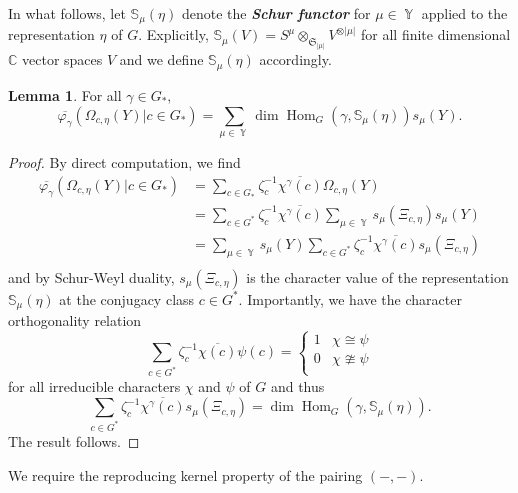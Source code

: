 \documentclass[12pt,reqno]{amsart}
\theoremstyle{definition}
\newtheorem{lem}[thm]{Lemma}
\DeclareMathOperator{\Par}{\mathbb{Y}}
\DeclareMathOperator{\Hom}{\mathrm{Hom}}
\begin{document}
In what follows, let $\mathbb{S}_{\mu}(\eta)$ denote the \textbf{\textit{Schur functor}} for $\mu \in \Par$ applied to the representation $\eta$ of $G.$ Explicitly, 
$\mathbb{S}_{\mu}(V) = S^{\mu} \otimes_{\mathfrak{S}_{|\mu|}} V^{\otimes |\mu|}$ for all finite dimensional $\mathbb{C}$ vector spaces $V$ and we define $\mathbb{S}_{\mu}(\eta)$ accordingly.

\begin{lem}\label{irrep alphabet tranform lem}
For all $\gamma \in G_*,$
    $$\overline{\varphi_{\gamma}}\left( \Omega_{c,\eta}(Y) | c \in G_* \right) =  \sum_{\mu \in \Par} \dim \Hom_{G}(\gamma, \mathbb{S}_{\mu}(\eta)) s_{\mu}(Y).$$
\end{lem}
\begin{proof}
    By direct computation, we find
    \begin{align*}
        \overline{\varphi_{\gamma}}\left( \Omega_{c,\eta}(Y) | c \in G_* \right) &= \sum_{c \in G_*} \zeta_c^{-1} \overline{\chi^{\gamma}(c)} \Omega_{c,\eta}(Y)\\
        &= \sum_{c \in G^*} \zeta_c^{-1} \overline{\chi^{\gamma}(c)} \sum_{\mu \in \Par} s_{\mu}(\Xi_{c,\eta} ) s_{\mu}(Y) \\
        &= \sum_{\mu \in \Par} s_{\mu}(Y) \sum_{c \in G^*} \zeta_c^{-1} \overline{\chi^{\gamma}(c)} s_{\mu}(\Xi_{c,\eta})\\
    \end{align*}
and by Schur-Weyl duality, $s_{\mu}(\Xi_{c,\eta})$ is the character value of the representation $\mathbb{S}_{\mu}(\eta)$ at the conjugacy class $c \in G^*.$ Importantly, we have the character orthogonality relation $$ \sum_{c \in G^*} \zeta_c^{-1} \overline{\chi(c)} \psi(c) = \begin{cases}
    1 & \chi \cong \psi\\
    0 & \chi \ncong \psi \\
\end{cases}$$ for all irreducible characters $\chi$ and $\psi$ of $G$ and thus
$$\sum_{c \in G^*} \zeta_c^{-1} \overline{\chi^{\gamma}(c)} s_{\mu}(\Xi_{c,\eta}) = \dim \Hom_{G}(\gamma, \mathbb{S}_{\mu}(\eta)).$$ The result follows.
\end{proof}

We require the reproducing kernel property of the pairing $(-,-).$
\end{document}

